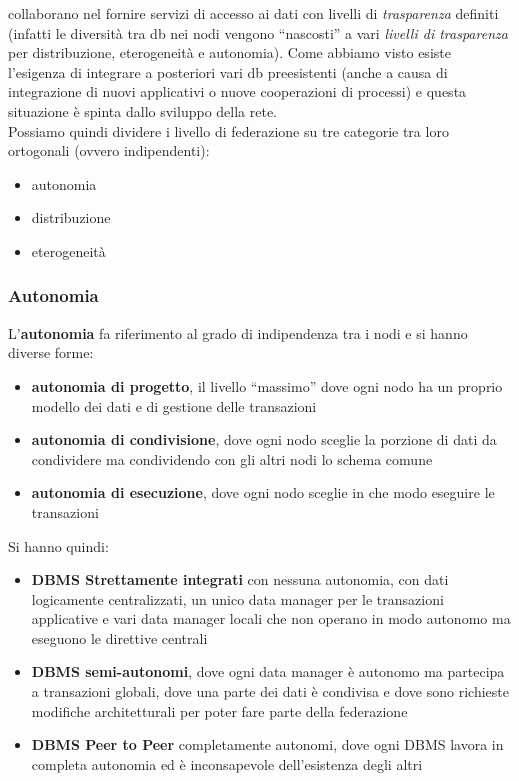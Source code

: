 \documentclass[a4paper,12pt, oneside]{book}
\begin{document}
collaborano nel fornire servizi di accesso ai dati con livelli di
\textit{trasparenza} definiti (infatti le diversità tra db nei nodi vengono
``nascosti'' a vari \textit{livelli di trasparenza} per distribuzione,
eterogeneità e autonomia). Come abbiamo visto esiste l'esigenza di integrare a
posteriori vari db preesistenti (anche a causa di integrazione di nuovi
applicativi o nuove cooperazioni di processi) e questa situazione è spinta
dallo sviluppo della rete.\\
Possiamo quindi dividere i livello di federazione su tre categorie tra loro
ortogonali (ovvero indipendenti):
\begin{itemize}
  \item autonomia
  \item distribuzione
  \item eterogeneità
\end{itemize}
\subsubsection{Autonomia}
L'\textbf{autonomia} fa riferimento al grado di indipendenza tra i nodi e si
hanno diverse forme:
\begin{itemize}
  \item \textbf{autonomia di progetto}, il livello ``massimo'' dove ogni nodo ha
  un proprio modello dei dati e di gestione delle transazioni
  \item \textbf{autonomia di condivisione}, dove ogni nodo sceglie la porzione
  di dati da condividere ma condividendo con gli altri nodi lo schema comune
  \item \textbf{autonomia di esecuzione}, dove ogni nodo sceglie in che modo
  eseguire le transazioni
\end{itemize}
Si hanno quindi:
\begin{itemize}
  \item \textbf{DBMS Strettamente integrati} con nessuna autonomia, con dati
  logicamente centralizzati, un unico data manager per le transazioni
  applicative e vari data manager locali che non operano in modo autonomo ma
  eseguono le direttive centrali
  \item \textbf{DBMS semi-autonomi}, dove ogni data manager è autonomo ma
  partecipa a transazioni globali, dove una parte dei dati è condivisa e dove
  sono richieste modifiche architetturali  per poter fare parte della
  federazione
  \item \textbf{DBMS Peer to Peer} completamente autonomi, dove ogni DBMS lavora
  in completa autonomia ed è inconsapevole dell'esistenza degli altri  
\end{itemize}
\end{document}
